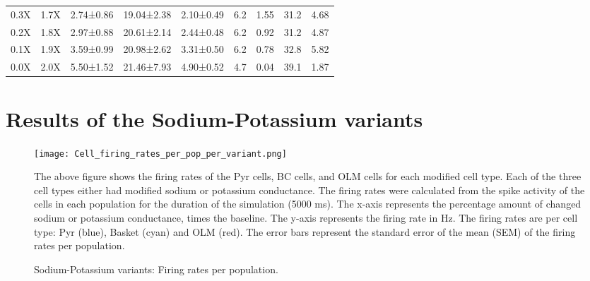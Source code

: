 \begin{table}[htbp]
\begin{adjustbox}{width=\textwidth}
\begin{tabular}{ccccccccc}
            0.3X       & 1.7X        & 2.74±0.86                     & 19.04±2.38 & 2.10±0.49 & 6.2 & 1.55 & 31.2 & 4.68 \\
            0.2X       & 1.8X        & 2.97±0.88                     & 20.61±2.14 & 2.44±0.48 & 6.2 & 0.92 & 31.2 & 4.87 \\
            0.1X       & 1.9X        & 3.59±0.99                     & 20.98±2.62 & 3.31±0.50 & 6.2 & 0.78 & 32.8 & 5.82 \\
            0.0X       & 2.0X        & 5.50±1.52                     & 21.46±7.93 & 4.90±0.52 & 4.7 & 0.04 & 39.1 & 1.87 \\
            \hline
        \end{tabular}
    \end{adjustbox}
\end{table}
\pagebreak
\section{Results of the Sodium-Potassium variants}


\begin{figure}[htbp]
    \centering
    \texttt{[image: Cell\_firing\_rates\_per\_pop\_per\_variant.png]}
    \caption[Sodium-Potassium variants: Firing rates per population]{Sodium-Potassium variants: Firing rates per population.}\label{fig:sodium_potassium_firing_rates}
    \begin{minipage}{0.9\textwidth}
        The above figure shows the firing rates of the Pyr cells, BC cells, and OLM cells for each modified cell type.
        Each of the three cell types either had modified sodium or potassium conductance.
        The firing rates were calculated from the spike activity of the cells in each population for the duration of the simulation (5000 ms).
        The x-axis represents the percentage amount of changed sodium or potassium conductance, times the baseline.
        The y-axis represents the firing rate in Hz.
        The firing rates are per cell type: Pyr (blue), Basket (cyan) and OLM (red).
        The error bars represent the standard error of the mean (SEM) of the firing rates per population.
    \end{minipage}
\end{figure}

